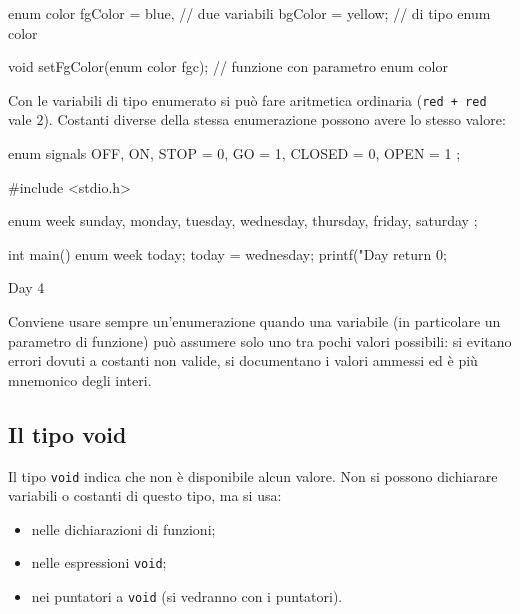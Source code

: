 \documentclass[11pt,a4paper]{article}
\begin{document}
\begin{codice}
enum color fgColor = blue,          // due variabili
           bgColor = yellow;        // di tipo enum color

void setFgColor(enum color fgc);    // funzione con parametro enum color
\end{codice}

Con le variabili di tipo enumerato si può fare aritmetica ordinaria
(\lstinline|red + red| vale $2$). Costanti diverse della stessa enumerazione
possono avere lo stesso valore:
\begin{codice}
enum signals { OFF, ON, STOP = 0, GO = 1, CLOSED = 0, OPEN = 1 };
\end{codice}

\begin{esempio}
\begin{codice}
#include <stdio.h>

enum week { sunday, monday, tuesday, wednesday, thursday, friday, saturday };

int main() {
    enum week today;
    today = wednesday;
    printf("Day %
    return 0;
}
\end{codice}
\begin{risultato}
Day 4
\end{risultato}
\end{esempio}

\begin{osservazione}
Conviene usare sempre un'enumerazione quando una variabile (in particolare un
parametro di funzione) può assumere solo uno tra pochi valori possibili: si evitano
errori dovuti a costanti non valide, si documentano i valori ammessi ed è più
mnemonico degli interi.
\end{osservazione}

\subsection{Il tipo void}

Il tipo \lstinline|void| indica che non è disponibile alcun valore. Non si possono
dichiarare variabili o costanti di questo tipo, ma si usa:
\begin{itemize}
    \item nelle dichiarazioni di funzioni;
    \item nelle espressioni \lstinline|void|;
    \item nei puntatori a \lstinline|void| (si vedranno con i puntatori).
\end{itemize}
\end{document}
